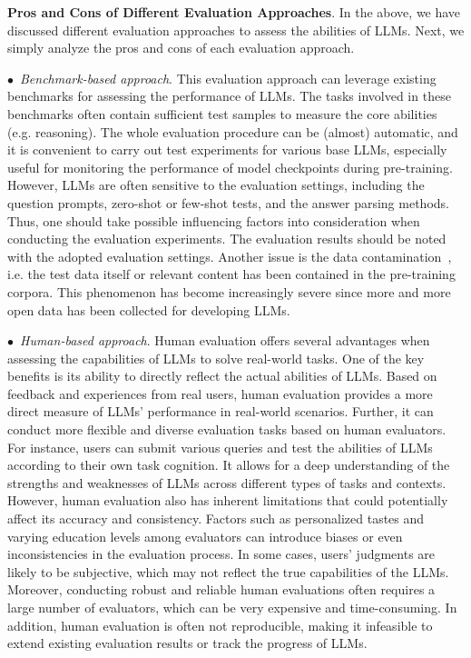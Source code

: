 {{\textbf{Pros and Cons of Different Evaluation Approaches}. In the above, we have discussed different evaluation approaches to assess the abilities of LLMs. Next, we simply analyze the pros and cons of each evaluation approach.  

$\bullet$~\emph{Benchmark-based approach}. This evaluation approach can leverage existing benchmarks for assessing the performance of LLMs. The tasks involved in these benchmarks often contain sufficient test samples to measure the core abilities (e.g. reasoning). The whole evaluation procedure can be (almost) automatic, and it is convenient to carry out test experiments for various base LLMs, especially useful for monitoring the performance of model checkpoints during pre-training. However, LLMs are often sensitive to the evaluation settings, including the question prompts, zero-shot or few-shot tests, and the answer parsing methods. Thus, one should take possible influencing factors into consideration when conducting the evaluation experiments. The evaluation results should be noted with the adopted evaluation settings. Another issue is the data contamination~\cite{Chowdhery-arxiv-2022-PaLM,zhou-arxiv-2023-dont}, i.e. the test data itself or relevant content has been contained in the pre-training corpora. This phenomenon has become increasingly severe since more and more open data has been collected for developing LLMs.

$\bullet$~\emph{Human-based approach}. Human evaluation offers several advantages when assessing the capabilities of LLMs to solve real-world tasks. One of the key benefits is its ability to directly reflect the actual abilities of LLMs. Based on feedback and experiences from real users, human evaluation provides a more direct measure of LLMs' performance in real-world scenarios. Further, it can conduct more flexible and diverse evaluation tasks based on human evaluators. For instance, users can submit various queries and test the abilities of LLMs according to their own task cognition. It allows for a deep understanding of the strengths and weaknesses of LLMs across different types of tasks and contexts. However, human evaluation also has inherent limitations that could potentially affect its accuracy and consistency. Factors such as personalized tastes and varying education levels among evaluators can introduce biases or even inconsistencies in the evaluation process. In some cases, users' judgments are likely to be subjective, which may not reflect the true capabilities of the LLMs. Moreover, conducting robust and reliable human evaluations often requires a large number of evaluators, which can be very expensive and time-consuming. In addition, human evaluation is often not reproducible, making it infeasible to extend existing evaluation results or track the progress of LLMs.

}}
